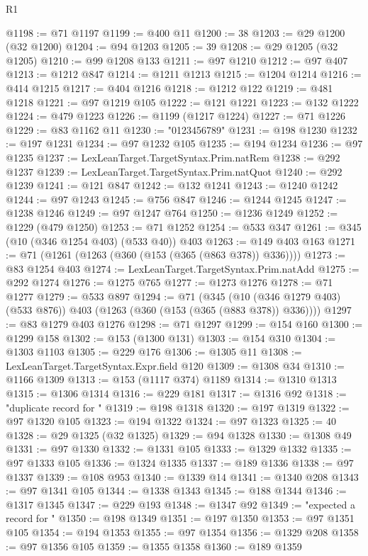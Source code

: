 \begin{lexlean}{R1}
\begin{coremodule}
@1198 := @71 @1197
@1199 := @400 @11
@1200 := 38
@1203 := @29 @1200 (@32 @1200)
@1204 := @94 @1203
@1205 := 39
@1208 := @29 @1205 (@32 @1205)
@1210 := @99 @1208 @133
@1211 := @97 @1210
@1212 := @97 @407
@1213 := @1212 @847
@1214 := @1211 @1213
@1215 := @1204 @1214
@1216 := @414 @1215
@1217 := @404 @1216
@1218 := @1212 @122
@1219 := @481 @1218
@1221 := @97 @1219 @105
@1222 := @121 @1221
@1223 := @132 @1222
@1224 := @479 @1223
@1226 := @1199 (@1217 @1224)
@1227 := @71 @1226
@1229 := @83 @1162 @11
@1230 := "0123456789"
@1231 := @198 @1230
@1232 := @197 @1231
@1234 := @97 @1232 @105
@1235 := @194 @1234
@1236 := @97 @1235
@1237 := LexLeanTarget.TargetSyntax.Prim.natRem
@1238 := @292 @1237
@1239 := LexLeanTarget.TargetSyntax.Prim.natQuot
@1240 := @292 @1239
@1241 := @121 @847
@1242 := @132 @1241
@1243 := @1240 @1242
@1244 := @97 @1243
@1245 := @756 @847
@1246 := @1244 @1245
@1247 := @1238 @1246
@1249 := @97 @1247 @764
@1250 := @1236 @1249
@1252 := @1229 (@479 @1250)
@1253 := @71 @1252
@1254 := @533 @347
@1261 := @345 (@10 (@346 @1254 @403) (@533 @40)) @403
@1263 := @149 @403 @163
@1271 := @71 (@1261 (@1263 (@360 (@153 (@365 (@863 @378)) @336))))
@1273 := @83 @1254 @403
@1274 := LexLeanTarget.TargetSyntax.Prim.natAdd
@1275 := @292 @1274
@1276 := @1275 @765
@1277 := @1273 @1276
@1278 := @71 @1277
@1279 := @533 @897
@1294 := @71
    (@345 (@10 (@346 @1279 @403) (@533 @876)) @403 (@1263 (@360 (@153 (@365 (@883 @378)) @336))))
@1297 := @83 @1279 @403 @1276
@1298 := @71 @1297
@1299 := @154 @160
@1300 := @1299 @158
@1302 := @153 (@1300 @131)
@1303 := @154 @310
@1304 := @1303 @1103
@1305 := @229 @176
@1306 := @1305 @11
@1308 := LexLeanTarget.TargetSyntax.Expr.field @120
@1309 := @1308 @34
@1310 := @1166 @1309
@1313 := @153 (@1117 @374) @1189
@1314 := @1310 @1313
@1315 := @1306 @1314
@1316 := @229 @181
@1317 := @1316 @92
@1318 := "duplicate record for "
@1319 := @198 @1318
@1320 := @197 @1319
@1322 := @97 @1320 @105
@1323 := @194 @1322
@1324 := @97 @1323
@1325 := 40
@1328 := @29 @1325 (@32 @1325)
@1329 := @94 @1328
@1330 := @1308 @49
@1331 := @97 @1330
@1332 := @1331 @105
@1333 := @1329 @1332
@1335 := @97 @1333 @105
@1336 := @1324 @1335
@1337 := @189 @1336
@1338 := @97 @1337
@1339 := @108 @953
@1340 := @1339 @14
@1341 := @1340 @208
@1343 := @97 @1341 @105
@1344 := @1338 @1343
@1345 := @188 @1344
@1346 := @1317 @1345
@1347 := @229 @193
@1348 := @1347 @92
@1349 := "expected a record for "
@1350 := @198 @1349
@1351 := @197 @1350
@1353 := @97 @1351 @105
@1354 := @194 @1353
@1355 := @97 @1354
@1356 := @1329 @208
@1358 := @97 @1356 @105
@1359 := @1355 @1358
@1360 := @189 @1359

\end{coremodule}
\end{lexlean}
